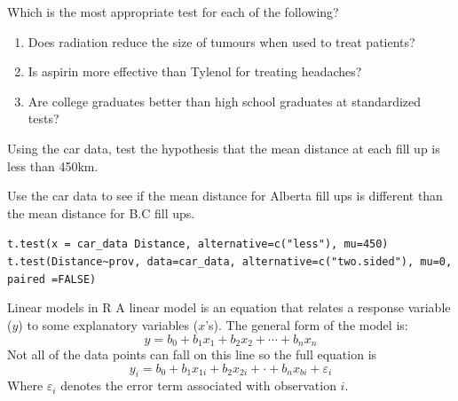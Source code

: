\documentclass[xcolor=svgnames, 10pt, handout]{beamer}
\begin{document}
\begin{frame}[fragile]\small
\begin{question}
Which is the most appropriate test for each of the following?
\begin{enumerate}
\item Does radiation reduce the size of tumours when used to treat patients?  
\item Is aspirin more effective than Tylenol for treating headaches?  
\item Are college graduates better than high school graduates at standardized tests?   
\end{enumerate}
\end{question}
\end{frame}


\begin{frame}[fragile]
\begin{question}
Using the car data, test the hypothesis that the mean distance at each fill up is less than 450km.
\end{question}
\vfill
\begin{question}
Use the car data to see if the mean distance for Alberta fill ups is different than the mean distance for B.C fill ups.
\end{question}
\pause
\pause
\verb|t.test(x = car_data Distance, alternative=c("less"), mu=450)|
\pause
\verb|t.test(Distance~prov, data=car_data, alternative=c("two.sided"), mu=0, paired =FALSE)|
\end{frame}


\begin{frame}[fragile]{Linear models in R}
\vfill
A linear model is an equation that relates a response variable ($y$) to some explanatory variables ($x$'s).  The general form of the model is:
$$y = b_0 + b_1x_1 + b_2x_2 + \cdots + b_nx_n$$
\vfill
Not all of the data points can fall on this line so the full equation is
$$y_i = b_0 + b_1 x_{1i} + b_2x_{2i} + \cdot + b_nx_{bi} + \varepsilon_i$$
\vfill
Where $\varepsilon_i$ denotes the error term associated with observation $i$.
\vfill
\end{frame}
\end{document}
